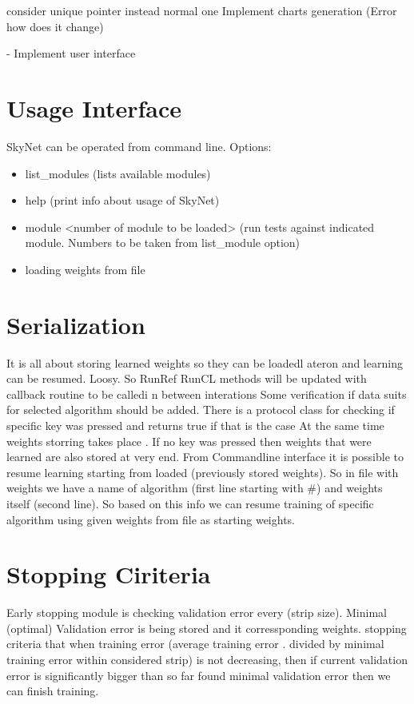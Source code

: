 \documentclass[a4paper,10pt]{article}
\begin{document}
consider unique pointer instead normal one
Implement charts generation (Error how does it change) 

- Implement user interface 
\section{Usage Interface}
SkyNet can be operated from command line. Options:
\begin{itemize}
\item list\_modules (lists available modules)
\item help (print info about usage of SkyNet)
\item module <number of module to be loaded> (run tests against indicated module. Numbers to be taken from list\_module option)
\item loading weights from file
\end{itemize}

\section{Serialization}
It is all about storing learned weights so they can be loadedl ateron and learning can be resumed.
Loosy. So RunRef RunCL methods will be updated with callback routine to be calledi n between interations
Some verification if data suits for selected algorithm should be added. 
There is a protocol class for checking if specific key was pressed and returns true if that is the case
At the same time weights storring takes place . If no key was pressed then weights that were learned are also stored at very end.
From Commandline interface it is possible to resume learning starting from loaded (previously stored weights).
So in file with weights we have a name of algorithm (first line starting with \#) and weights itself (second line). So
based on this info we can resume training of specific algorithm using given weights from file as starting weights.


\section{Stopping Ciriteria}
Early stopping module is checking validation error every (strip size). Minimal (optimal) Validation error is being
stored and it corressponding weights. stopping criteria that when training error (average training error . divided by minimal training error
within considered strip) is not decreasing, then if current validation error is significantly bigger than so far found minimal validation error then
we can finish training.
\end{document}
